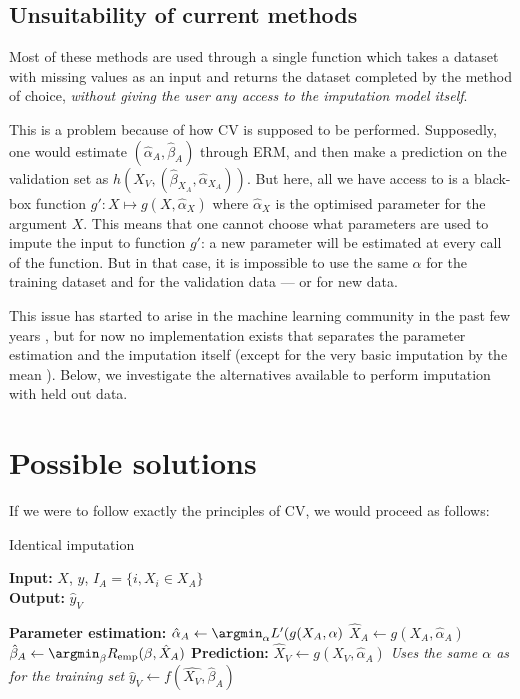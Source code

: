 		\subsection{Unsuitability of current methods}
Most of these methods are used through a single function which takes a dataset with missing values as an input and returns the dataset completed by the method of choice, \emph{without giving the user any access to the imputation model itself}. \cite{stekhoven2015missforest} \cite{josse2016missmda}\cite{MICE_founding}\cite{ref_amelia}

This is a problem because of how CV is supposed to be performed. Supposedly, one would estimate $(\hat{\alpha}_A, \hat{\beta}_A)$ through ERM, and then make a prediction on the validation set as $h(X_V,(\hat{\beta}_{X_A},\hat{\alpha}_{X_A}))$. But here, all we have access to is a black-box function $g': X \mapsto g(X, \hat{\alpha}_X)$ where $\hat{\alpha}_X$ is the optimised parameter for the argument $X$. This means that one cannot choose what parameters are used to impute the input to function $g'$: a new parameter will be estimated at every call of the function. But in that case, it is impossible to use the same $\alpha$ for the training dataset and for the validation data --- or for new data.
	
This issue has started to arise in the machine learning community in the past few years \cite{thread_newdata1}\cite{thread_newdata2}\cite{thread_newdata3}, but for now no implementation exists that separates the parameter estimation and the imputation itself (except for the very basic imputation by the mean \cite{mean_imputation}). Below, we investigate the alternatives available to perform imputation with held out data.

	\section{Possible solutions}
	\label{ERM.solutions}
	
If we were to follow exactly the principles of CV, we would proceed as follows: 
\begin{algorithm}[H]
	\caption{Identical imputation}
	\hspace*{\algorithmicindent} \textbf{Input:} $X$, $y$, $I_A=\{i, X_i \in X_A\}$ \\
 	\hspace*{\algorithmicindent} \textbf{Output:} $\hat{y}_V$
	\begin{algorithmic}[1]
		\State \textbf{Parameter estimation:}
		\Indstate $\hat{\alpha}_A \leftarrow \argmin_{\alpha} L'(g(X_A,\alpha)$
		\Indstate $\hat{X}_A \leftarrow g(X_A, \hat{\alpha}_A)$
		\Indstate $\hat{\beta}_A \leftarrow \argmin_{\beta} R_{\text{emp}}(\beta,\hat{X}_A)$
		\State \textbf{Prediction:}
		\Indstate $\hat{X}_V \leftarrow g(X_V, \hat{\alpha}_A)$ \Comment \emph{Uses the same $\alpha$ as for the training set}
		\Indstate $\hat{y}_V \leftarrow f(\hat{X_V}, \hat{\beta}_A)$
	\end{algorithmic}
\end{algorithm}

